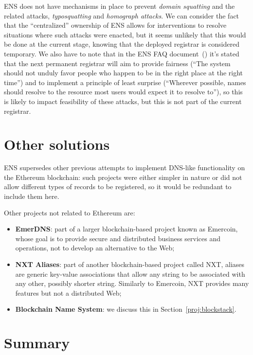 \documentclass[mscthesis]{usiinfthesis}
\begin{document}
ENS does not have mechanisms in place to prevent \emph{domain squatting} and the related attacks, \emph{typosquatting} and \emph{homograph attacks}. We can consider the fact that the ``centralized'' ownership of ENS allows for interventions to resolve situations where such attacks were enacted, but it seems unlikely that this would be done at the current stage, knowing that the deployed registrar is considered temporary. We also have to note that in the ENS FAQ document~(\cite{website:ensfaq}) it's stated that the next permanent registrar will aim to provide fairness (``The system should not unduly favor people who happen to be in the right place at the right time'') and to implement a principle of least surprise (``Wherever possible, names should resolve to the resource most users would expect it to resolve to''), so this is likely to impact feasibility of these attacks, but this is not part of the current registrar.

\section{Other solutions}
ENS supersedes other previous attempts to implement DNS-like functionality on the Ethereum blockchain: such projects were either simpler in nature or did not allow different types of records to be registered, %
so it would be redundant to include them here.

Other projects not related to Ethereum are:
\begin{itemize}
	\item \textbf{EmerDNS}: part of a larger blockchain-based project known as Emercoin, whose goal is to provide secure and distributed business services and operations, not to develop an alternative to the Web;
	\item \textbf{NXT Aliases}: part of another blockchain-based project called NXT, aliases are  generic key-value associations that allow any string to be associated with any other, possibly shorter string. Similarly to Emercoin, NXT provides many features but not a distributed Web;
	\item \textbf{Blockchain Name System}: we discuss this in Section~\ref{proj:blockstack}.
\end{itemize}


\section{Summary}
\end{document}
